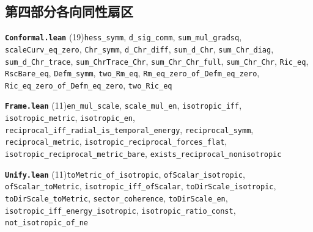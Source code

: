 \documentclass[11pt,a4paper]{article}
\theoremstyle{sudef}
\begin{document}
\subsection*{第四部分\quad 各向同性扇区}
\noindent\textbf{\texttt{Conformal.lean}} (19)\quad \texttt{hess\_\allowbreak symm}, \texttt{d\_\allowbreak sig\_\allowbreak comm}, \texttt{sum\_\allowbreak mul\_\allowbreak gradsq}, \texttt{scaleCurv\_\allowbreak eq\_\allowbreak zero}, \texttt{Chr\_\allowbreak symm}, \texttt{d\_\allowbreak Chr\_\allowbreak diff}, \texttt{sum\_\allowbreak d\_\allowbreak Chr}, \texttt{sum\_\allowbreak Chr\_\allowbreak diag}, \texttt{sum\_\allowbreak d\_\allowbreak Chr\_\allowbreak trace}, \texttt{sum\_\allowbreak ChrTrace\_\allowbreak Chr}, \texttt{sum\_\allowbreak Chr\_\allowbreak Chr\_\allowbreak full}, \texttt{sum\_\allowbreak Chr\_\allowbreak Chr}, \texttt{Ric\_\allowbreak eq}, \texttt{RscBare\_\allowbreak eq}, \texttt{Defm\_\allowbreak symm}, \texttt{two\_\allowbreak Rm\_\allowbreak eq}, \texttt{Rm\_\allowbreak eq\_\allowbreak zero\_\allowbreak of\_\allowbreak Defm\_\allowbreak eq\_\allowbreak zero}, \texttt{Ric\_\allowbreak eq\_\allowbreak zero\_\allowbreak of\_\allowbreak Defm\_\allowbreak eq\_\allowbreak zero}, \texttt{two\_\allowbreak Ric\_\allowbreak eq}\par\smallskip
\noindent\textbf{\texttt{Frame.lean}} (11)\quad \texttt{en\_\allowbreak mul\_\allowbreak scale}, \texttt{scale\_\allowbreak mul\_\allowbreak en}, \texttt{isotropic\_\allowbreak iff}, \texttt{isotropic\_\allowbreak metric}, \texttt{isotropic\_\allowbreak en}, \texttt{reciprocal\_\allowbreak iff\_\allowbreak radial\_\allowbreak is\_\allowbreak temporal\_\allowbreak energy}, \texttt{reciprocal\_\allowbreak symm}, \texttt{reciprocal\_\allowbreak metric}, \texttt{isotropic\_\allowbreak reciprocal\_\allowbreak forces\_\allowbreak flat}, \texttt{isotropic\_\allowbreak reciprocal\_\allowbreak metric\_\allowbreak bare}, \texttt{exists\_\allowbreak reciprocal\_\allowbreak nonisotropic}\par\smallskip
\noindent\textbf{\texttt{Unify.lean}} (11)\quad \texttt{toMetric\_\allowbreak of\_\allowbreak isotropic}, \texttt{ofScalar\_\allowbreak isotropic}, \texttt{ofScalar\_\allowbreak toMetric}, \texttt{isotropic\_\allowbreak iff\_\allowbreak ofScalar}, \texttt{toDirScale\_\allowbreak isotropic}, \texttt{toDirScale\_\allowbreak toMetric}, \texttt{sector\_\allowbreak coherence}, \texttt{toDirScale\_\allowbreak en}, \texttt{isotropic\_\allowbreak iff\_\allowbreak energy\_\allowbreak isotropic}, \texttt{isotropic\_\allowbreak ratio\_\allowbreak const}, \texttt{not\_\allowbreak isotropic\_\allowbreak of\_\allowbreak ne}\par\smallskip
\end{document}
